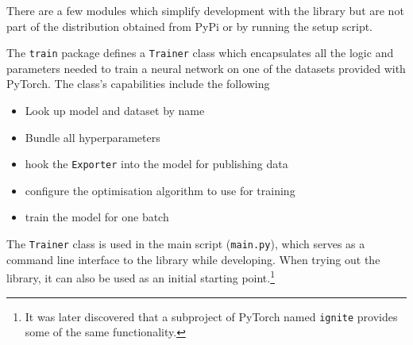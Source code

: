 There are a few modules which simplify development with the library but are not
part of the distribution obtained from PyPi or by running the setup script.

The \texttt{train} package defines a \texttt{Trainer} class which encapsulates
all the logic and parameters needed to train a neural network on one of the
datasets provided with PyTorch. The class's capabilities include the following

\begin{itemize}
    \item
        Look up model and dataset by name
    \item
        Bundle all hyperparameters
    \item
        hook the \texttt{Exporter} into the model for
        publishing data
    \item
        configure the optimisation algorithm to use for training
    \item
        train the model for one batch
\end{itemize}

The \texttt{Trainer} class is used in the main script (\texttt{main.py}), which
serves as a command line interface to the library while developing. When trying
out the library, it can also be used as an initial starting point.\footnote{It
was later discovered that a subproject of PyTorch named \texttt{ignite} provides
some of the same functionality.}

